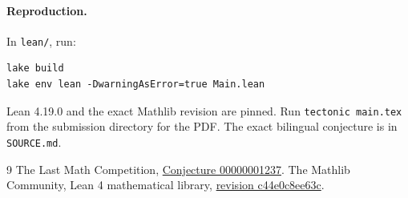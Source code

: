 \documentclass[11pt]{article}
\begin{document}
\paragraph{Reproduction.}
In \texttt{lean/}, run:
\begin{verbatim}
lake build
lake env lean -DwarningAsError=true Main.lean
\end{verbatim}
Lean 4.19.0 and the exact Mathlib revision are pinned.
Run \texttt{tectonic main.tex} from the submission directory for the PDF.
The exact bilingual conjecture is in \texttt{SOURCE.md}.

\begingroup\raggedright
\begin{thebibliography}{9}
 The Last Math Competition,
\href{https://github.com/The-Last-Math-Competition/The-Last-Math-Competition/blob/main/conjectures/00000001237.md}{Conjecture 00000001237}.
 The Mathlib Community, Lean 4 mathematical library,
\href{https://github.com/leanprover-community/mathlib4/commit/c44e0c8ee63ca166450922a373c7409c5d26b00b}{revision c44e0c8ee63c}.
\end{thebibliography}
\endgroup
\end{document}
